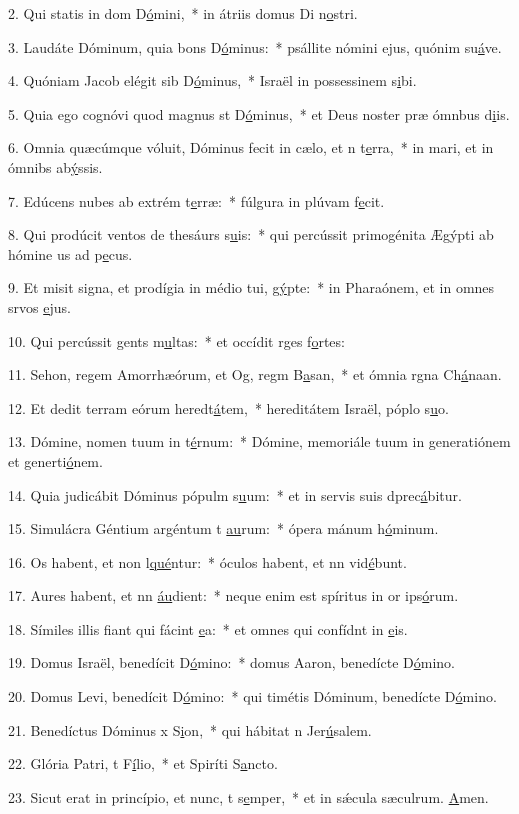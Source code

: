 2. Qui statis in dom D\uline{ó}mini,~* in átriis domus Di n\uline{o}stri.\par 
3. Laudáte Dóminum, quia bons D\uline{ó}minus:~* psállite nómini ejus, quónim su\uline{á}ve.\par 
4. Quóniam Jacob elégit sib D\uline{ó}minus,~* Israël in possessinem s\uline{i}bi.\par 
5. Quia ego cognóvi quod magnus st D\uline{ó}minus,~* et Deus noster præ ómnbus d\uline{i}is.\par 
6. Omnia quæcúmque vóluit, Dóminus fecit in cælo, et n t\uline{e}rra,~* in mari, et in ómnibs ab\uline{ý}ssis.\par 
7. Edúcens nubes ab extrém t\uline{e}rræ:~* fúlgura in plúvam f\uline{e}cit.\par 
8. Qui prodúcit ventos de thesáurs s\uline{u}is:~* qui percússit primogénita Ægýpti ab hómine us ad p\uline{e}cus.\par 
9. Et misit signa, et prodígia in médio tui, g\uline{ý}pte:~* in Pharaónem, et in omnes srvos \uline{e}jus.\par 
10. Qui percússit gents m\uline{u}ltas:~* et occídit rges f\uline{o}rtes:\par 
11. Sehon, regem Amorrhæórum, et Og, regm B\uline{a}san,~* et ómnia rgna Ch\uline{á}naan.\par 
12. Et dedit terram eórum heredt\uline{á}tem,~* hereditátem Israël, póplo s\uline{u}o.\par 
13. Dómine, nomen tuum in t\uline{é}rnum:~* Dómine, memoriále tuum in generatiónem et generti\uline{ó}nem.\par 
14. Quia judicábit Dóminus pópulm s\uline{u}um:~* et in servis suis dprec\uline{á}bitur.\par 
15. Simulácra Géntium argéntum t \uline{au}rum:~* ópera mánum h\uline{ó}minum.\par 
16. Os habent, et non l\uline{qué}ntur:~* óculos habent, et nn vid\uline{é}bunt.\par 
17. Aures habent, et nn \uline{áu}dient:~* neque enim est spíritus in or ips\uline{ó}rum.\par 
18. Símiles illis fiant qui fácint \uline{e}a:~* et omnes qui confídnt in \uline{e}is.\par 
19. Domus Israël, benedícit D\uline{ó}mino:~* domus Aaron, benedícte D\uline{ó}mino.\par 
20. Domus Levi, benedícit D\uline{ó}mino:~* qui timétis Dóminum, benedícte D\uline{ó}mino.\par 
21. Benedíctus Dóminus x S\uline{i}on,~* qui hábitat n Jer\uline{ú}salem.\par 
22. Glória Patri, t F\uline{í}lio,~* et Spiríti S\uline{a}ncto.\par 
23. Sicut erat in princípio, et nunc, t s\uline{e}mper,~* et in sǽcula sæculrum. \uline{A}men.\par 
